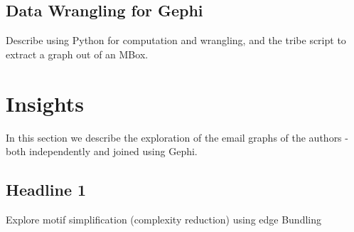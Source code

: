\documentclass[11pt,letterpaper]{article}
\begin{document}
\subsection*{Data Wrangling for Gephi}

Describe using Python for computation and wrangling, and the tribe script to extract a graph out of an MBox.

\section*{Insights}
In this section we describe the exploration of the email graphs of the authors - both independently and joined using Gephi.

\subsection*{Headline 1}

Explore motif simplification (complexity reduction) using edge Bundling
\end{document}
